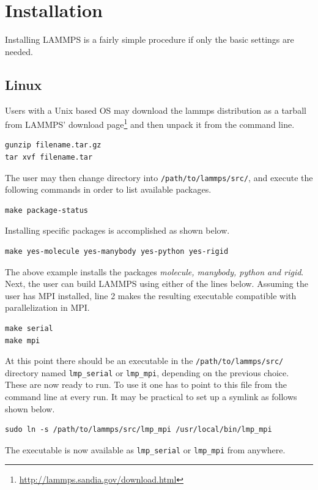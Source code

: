 \documentclass[twoside,english]{uiofysmaster}
\begin{document}
\section{Installation}
Installing LAMMPS is a fairly simple procedure if only the basic settings are needed.

\subsection{Linux}
Users with a Unix based OS may download the lammps distribution as a tarball from LAMMPS' download page\footnote{\href{http://lammps.sandia.gov/download.html}{http://lammps.sandia.gov/download.html}} and then unpack it from the command line.
\begin{lstlisting}
gunzip filename.tar.gz
tar xvf filename.tar
\end{lstlisting}
The user may then change directory into \texttt{/path/to/lammps/src/}, and execute the following commands in order to list available packages. 
\begin{lstlisting}
make package-status
\end{lstlisting}
Installing specific packages is accomplished as shown below.
\begin{lstlisting}
make yes-molecule yes-manybody yes-python yes-rigid 
\end{lstlisting}
The above example installs the packages \textit{molecule, manybody, python and rigid}.
Next, the user can build LAMMPS using either of the lines below. 
Assuming the user has MPI installed, line 2 makes the resulting executable compatible with parallelization in MPI.
\begin{lstlisting}
make serial
make mpi
\end{lstlisting}
At this point there should be an executable in the \texttt{/path/to/lammps/src/} directory named \texttt{lmp\_serial} or \texttt{lmp\_mpi}, depending on the previous choice. These are now ready to run.
To use it one has to point to this file from the command line at every run. It may be practical to set up a symlink as follows shown below.

\begin{lstlisting}
sudo ln -s /path/to/lammps/src/lmp_mpi /usr/local/bin/lmp_mpi
\end{lstlisting}
The executable is now available as \texttt{lmp\_serial} or \texttt{lmp\_mpi} from anywhere.
\end{document}
